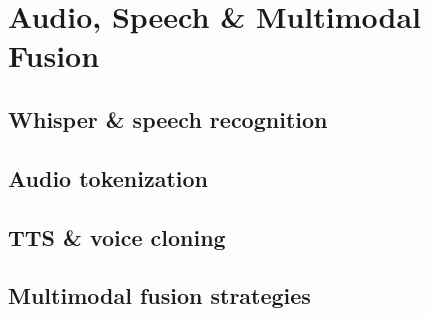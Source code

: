 
\section{Audio, Speech \& Multimodal Fusion}

\subsection{Whisper \& speech recognition}


\subsection{Audio tokenization}


\subsection{TTS \& voice cloning}


\subsection{Multimodal fusion strategies}


